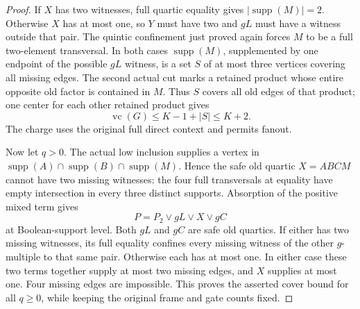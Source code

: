 \documentclass[11pt]{article}
\newcommand{\supp}{\operatorname{supp}}
\newcommand{\vc}{\operatorname{vc}}
\theoremstyle{definition}
\theoremstyle{remark}
\begin{document}
\begin{proof}
If $X$ has two witnesses, full quartic equality gives
$|\supp(M)|=2$. Otherwise $X$ has at most one, so $Y$ must have two and
$gL$ must have a witness outside that pair. The quintic confinement just
proved again forces $M$ to be a full two-element transversal. In both
cases $\supp(M)$, supplemented by one endpoint of the possible $gL$
witness, is a set $S$ of at most three vertices covering all missing
edges. The second actual cut marks a retained product whose entire
opposite old factor is contained in $M$. Thus $S$ covers all old edges of
that product; one center for each other retained product gives
\[
 \vc(G)\le K-1+|S|\le K+2.
\]
The charge uses the original full direct context and permits fanout.

Now let $q>0$. The actual low inclusion supplies a vertex in
$\supp(A)\cap\supp(B)\cap\supp(M)$. Hence the safe old quartic $X=ABCM$
cannot have two missing witnesses: the four full transversals at equality
have empty intersection in every three distinct supports. Absorption of
the positive mixed term gives
\[
 P=P_2\vee gL\vee X\vee gC
\]
at Boolean-support level. Both $gL$ and $gC$ are safe old quartics.
If either has two missing witnesses, its full equality confines every
missing witness of the other $g$-multiple to that same pair. Otherwise
each has at most one. In either case these two terms together supply at
most two missing edges, and $X$ supplies at most one. Four missing edges
are impossible. This proves the asserted cover bound for all $q\ge0$,
while keeping the original frame and gate counts fixed.
\end{proof}
\end{document}
